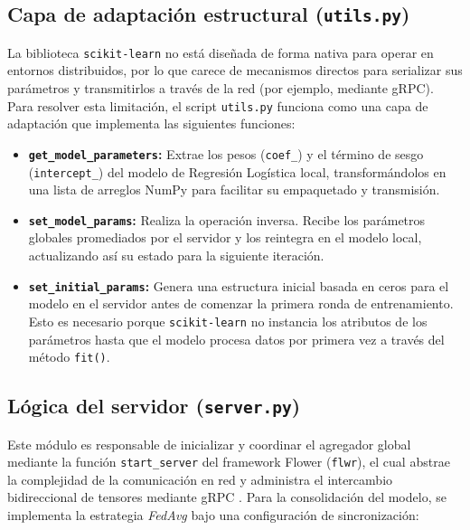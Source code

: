 \documentclass[12pt,a4paper]{article}
\begin{document}
\subsection{Capa de adaptación estructural (\texttt{utils.py})}
La biblioteca \texttt{scikit-learn} no está diseñada de forma nativa para operar en entornos distribuidos, por lo que carece de mecanismos directos para serializar sus parámetros y transmitirlos a través de la red (por ejemplo, mediante gRPC). Para resolver esta limitación, el script \texttt{utils.py} funciona como una capa de adaptación que implementa las siguientes funciones:

\begin{itemize}
\item \textbf{\texttt{get\_model\_parameters}:} Extrae los pesos (\texttt{coef\_}) y el término de sesgo (\texttt{intercept\_}) del modelo de Regresión Logística local, transformándolos en una lista de arreglos NumPy para facilitar su empaquetado y transmisión.

\item \textbf{\texttt{set\_model\_params}:} Realiza la operación inversa. Recibe los parámetros globales promediados por el servidor y los reintegra en el modelo local, actualizando así su estado para la siguiente iteración.

\item \textbf{\texttt{set\_initial\_params}:} Genera una estructura inicial basada en ceros para el modelo en el servidor antes de comenzar la primera ronda de entrenamiento. Esto es necesario porque \texttt{scikit-learn} no instancia los atributos de los parámetros hasta que el modelo procesa datos por primera vez a través del método \texttt{fit()}.
\end{itemize}

\subsection{Lógica del servidor (\texttt{server.py})}
Este módulo es responsable de inicializar y coordinar el agregador global mediante la función \texttt{start\_server} del framework Flower (\texttt{flwr}), el cual abstrae la complejidad de la comunicación en red y administra el intercambio bidireccional de tensores mediante gRPC \cite{beutel2020}. Para la consolidación del modelo, se implementa la estrategia \textit{FedAvg} bajo una configuración de sincronización:
\end{document}
